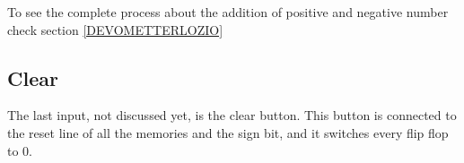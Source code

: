 \documentclass{article}
\begin{document}
\vspace{3mm}

To see the complete process about the addition of positive and negative number check section \ref{DEVOMETTERLOZIO}

\subsection{Clear}

The last input, not discussed yet, is the clear button. This button is connected to the reset line of all the memories and the sign bit, and it switches every flip flop to 0. 
\end{document}
